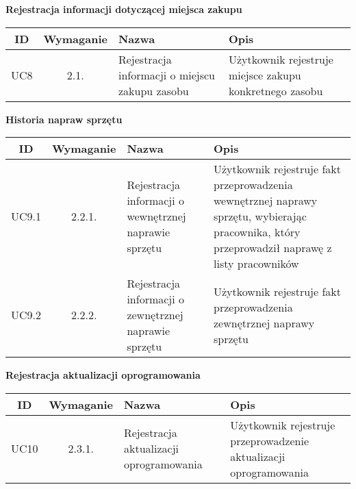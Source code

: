 \begin{table}[!ht]
	\begin{center}
		{\Large\bf Rejestracja informacji dotyczącej miejsca zakupu} \\
	\end{center}
\begin{tabular}{| c | c | p{} | p{} |}
	\hline \textbf{ID} & \textbf{Wymaganie} & \textbf{Nazwa} & \textbf{Opis} \\
	\hline UC8 & 2.1. & Rejestracja informacji o miejscu zakupu zasobu & Użytkownik rejestruje miejsce zakupu konkretnego zasobu \\
	\hline
\end{tabular}
\end{table}

\begin{table}[!ht]
	\begin{center}
		{\Large\bf Historia napraw sprzętu} \\
	\end{center}
\begin{tabular}{| c | c | p{} | p{} |}
	\hline \textbf{ID} & \textbf{Wymaganie} & \textbf{Nazwa} & \textbf{Opis} \\
	\hline UC9.1 & 2.2.1. & Rejestracja informacji o wewnętrznej naprawie sprzętu & Użytkownik rejestruje fakt przeprowadzenia wewnętrznej naprawy sprzętu, wybierając pracownika, który przeprowadził naprawę z listy pracowników \\
	\hline UC9.2 & 2.2.2. & Rejestracja informacji o zewnętrznej naprawie sprzętu & Użytkownik rejestruje fakt przeprowadzenia zewnętrznej naprawy sprzętu \\
	\hline
\end{tabular}
\end{table}

\begin{table}[!ht]
	\begin{center}
		{\Large\bf Rejestracja aktualizacji oprogramowania} \\
	\end{center}
\begin{tabular}{| c | c | p{} | p{} |}
	\hline \textbf{ID} & \textbf{Wymaganie} & \textbf{Nazwa} & \textbf{Opis} \\
	\hline UC10 & 2.3.1. & Rejestracja aktualizacji oprogramowania & Użytkownik rejestruje przeprowadzenie aktualizacji oprogramowania \\
	\hline
\end{tabular}
\end{table}

